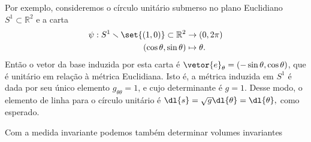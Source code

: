 Por exemplo, consideremos o círculo unitário submerso no plano Euclidiano \(S^1 \subset \mathbb{R}^2\) e a carta
\begin{align*}
    \psi : S^1 \smallsetminus \set{(1,0)} \subset \mathbb{R}^2 &\to (0, 2\pi)\\
    (\cos\theta,\sin\theta)&\mapsto \theta.
\end{align*}
Então o vetor da base induzida por esta carta é \(\vetor{e}_\theta = (-\sin\theta, \cos\theta)\), que é unitário em relação à métrica Euclidiana. Isto é, a métrica induzida em \(S^1\) é dada por seu único elemento \(g_{\theta\theta} = 1\), e cujo determinante é \(g = 1\). Desse modo, o elemento de linha para o círculo unitário é \(\dl{s} = \sqrt{g}\dl{\theta} = \dl{\theta},\) como esperado.

Com a medida invariante podemos também determinar volumes invariantes 
